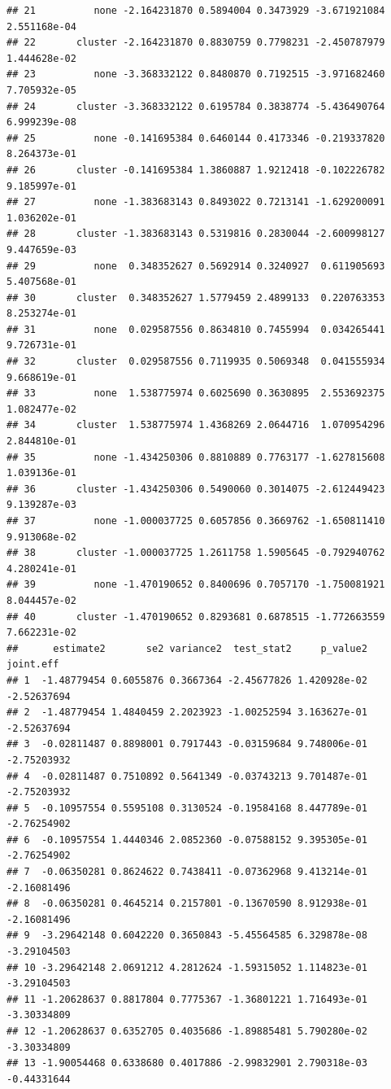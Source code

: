 \documentclass[
]{article}
\begin{document}
\begin{verbatim}
## 21          none -2.164231870 0.5894004 0.3473929 -3.671921084 2.551168e-04
## 22       cluster -2.164231870 0.8830759 0.7798231 -2.450787979 1.444628e-02
## 23          none -3.368332122 0.8480870 0.7192515 -3.971682460 7.705932e-05
## 24       cluster -3.368332122 0.6195784 0.3838774 -5.436490764 6.999239e-08
## 25          none -0.141695384 0.6460144 0.4173346 -0.219337820 8.264373e-01
## 26       cluster -0.141695384 1.3860887 1.9212418 -0.102226782 9.185997e-01
## 27          none -1.383683143 0.8493022 0.7213141 -1.629200091 1.036202e-01
## 28       cluster -1.383683143 0.5319816 0.2830044 -2.600998127 9.447659e-03
## 29          none  0.348352627 0.5692914 0.3240927  0.611905693 5.407568e-01
## 30       cluster  0.348352627 1.5779459 2.4899133  0.220763353 8.253274e-01
## 31          none  0.029587556 0.8634810 0.7455994  0.034265441 9.726731e-01
## 32       cluster  0.029587556 0.7119935 0.5069348  0.041555934 9.668619e-01
## 33          none  1.538775974 0.6025690 0.3630895  2.553692375 1.082477e-02
## 34       cluster  1.538775974 1.4368269 2.0644716  1.070954296 2.844810e-01
## 35          none -1.434250306 0.8810889 0.7763177 -1.627815608 1.039136e-01
## 36       cluster -1.434250306 0.5490060 0.3014075 -2.612449423 9.139287e-03
## 37          none -1.000037725 0.6057856 0.3669762 -1.650811410 9.913068e-02
## 38       cluster -1.000037725 1.2611758 1.5905645 -0.792940762 4.280241e-01
## 39          none -1.470190652 0.8400696 0.7057170 -1.750081921 8.044457e-02
## 40       cluster -1.470190652 0.8293681 0.6878515 -1.772663559 7.662231e-02
##      estimate2       se2 variance2  test_stat2     p_value2   joint.eff
## 1  -1.48779454 0.6055876 0.3667364 -2.45677826 1.420928e-02 -2.52637694
## 2  -1.48779454 1.4840459 2.2023923 -1.00252594 3.163627e-01 -2.52637694
## 3  -0.02811487 0.8898001 0.7917443 -0.03159684 9.748006e-01 -2.75203932
## 4  -0.02811487 0.7510892 0.5641349 -0.03743213 9.701487e-01 -2.75203932
## 5  -0.10957554 0.5595108 0.3130524 -0.19584168 8.447789e-01 -2.76254902
## 6  -0.10957554 1.4440346 2.0852360 -0.07588152 9.395305e-01 -2.76254902
## 7  -0.06350281 0.8624622 0.7438411 -0.07362968 9.413214e-01 -2.16081496
## 8  -0.06350281 0.4645214 0.2157801 -0.13670590 8.912938e-01 -2.16081496
## 9  -3.29642148 0.6042220 0.3650843 -5.45564585 6.329878e-08 -3.29104503
## 10 -3.29642148 2.0691212 4.2812624 -1.59315052 1.114823e-01 -3.29104503
## 11 -1.20628637 0.8817804 0.7775367 -1.36801221 1.716493e-01 -3.30334809
## 12 -1.20628637 0.6352705 0.4035686 -1.89885481 5.790280e-02 -3.30334809
## 13 -1.90054468 0.6338680 0.4017886 -2.99832901 2.790318e-03 -0.44331644

\end{verbatim}
\end{document}
